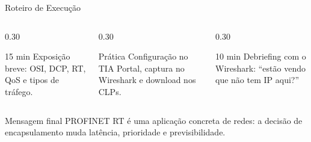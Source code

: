 \documentclass[10pt, aspectratio=169]{beamer}
\begin{document}
\begin{frame}{Roteiro de Execu\c{c}\~ao}
    \small
    \begin{columns}[T,totalwidth=\textwidth]
        \begin{column}{0.30\textwidth}
            \begin{block}{15 min}
                Exposi\c{c}\~ao breve: OSI, DCP, RT, QoS e tipos de tr\'afego.
            \end{block}
        \end{column}
        \begin{column}{0.30\textwidth}
            \begin{block}{Pr\'atica}
                Configura\c{c}\~ao no TIA Portal, captura no Wireshark e download nos CLPs.
            \end{block}
        \end{column}
        \begin{column}{0.30\textwidth}
            \begin{block}{10 min}
                Debriefing com o Wireshark: ``est\~ao vendo que n\~ao tem IP aqui?''
            \end{block}
        \end{column}
    \end{columns}

    \vspace{0.35cm}
    \begin{block}{Mensagem final}
        PROFINET RT \'e uma aplica\c{c}\~ao concreta de redes: a decis\~ao de encapsulamento muda lat\^encia, prioridade e previsibilidade.
    \end{block}
\end{frame}
\end{document}
